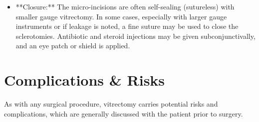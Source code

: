 \begin{itemize}
  \item **Closure:** The micro-incisions are often self-sealing (sutureless) with smaller gauge vitrectomy. In some cases, especially with larger gauge instruments or if leakage is noted, a fine suture may be used to close the sclerotomies. Antibiotic and steroid injections may be given subconjunctivally, and an eye patch or shield is applied.
\end{itemize}

\section*{Complications \& Risks}
As with any surgical procedure, vitrectomy carries potential risks and complications, which are generally discussed with the patient prior to surgery.

